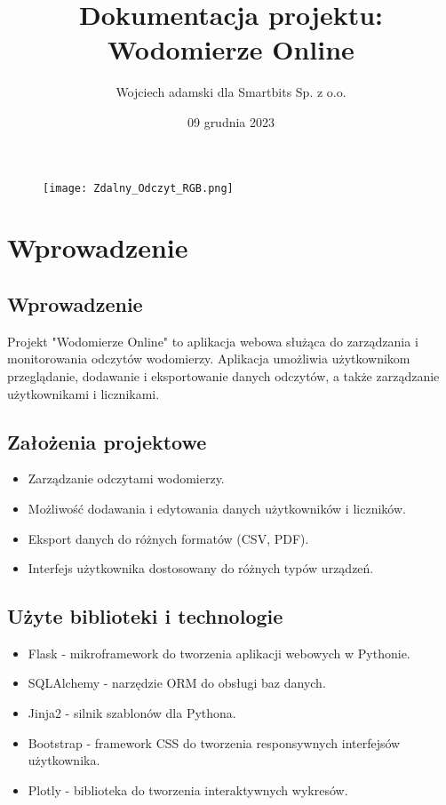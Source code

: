 \documentclass[12pt,a4paper]{report}
\begin{document}
\title{Dokumentacja projektu: Wodomierze Online}
\author{Wojciech adamski dla Smartbits Sp. z o.o.}
\date{09 grudnia 2023}
\begin{figure}
    \centering
    \texttt{[image: Zdalny\_Odczyt\_RGB.png]}

    \label{fig:enter-label}
\end{figure}
\maketitle
\tableofcontents
\newpage
\chapter{Wprowadzenie}
\section{Wprowadzenie}
Projekt "Wodomierze Online" to aplikacja webowa służąca do zarządzania i monitorowania odczytów wodomierzy. Aplikacja umożliwia użytkownikom przeglądanie, dodawanie i eksportowanie danych odczytów, a także zarządzanie użytkownikami i licznikami.

\section{Założenia projektowe}
\begin{itemize}
    \item Zarządzanie odczytami wodomierzy.
    \item Możliwość dodawania i edytowania danych użytkowników i liczników.
    \item Eksport danych do różnych formatów (CSV, PDF).
    \item Interfejs użytkownika dostosowany do różnych typów urządzeń.
\end{itemize}

\section{Użyte biblioteki i technologie}
\begin{itemize}
    \item Flask - mikroframework do tworzenia aplikacji webowych w Pythonie.
    \item SQLAlchemy - narzędzie ORM do obsługi baz danych.
    \item Jinja2 - silnik szablonów dla Pythona.
    \item Bootstrap - framework CSS do tworzenia responsywnych interfejsów użytkownika.
    \item Plotly - biblioteka do tworzenia interaktywnych wykresów.
\end{itemize}
\end{document}
